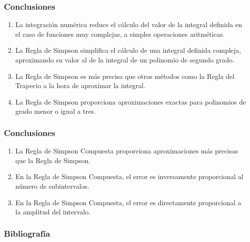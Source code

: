 \documentclass{beamer}
\begin{document}
\begin{frame}
  
  \frametitle{Conclusiones}
  
  \begin{block}{}
    \begin{enumerate}[<+->]
      \item La integraci\'on num\'erica reduce el c\'alculo del valor de la integral 
      definida en el caso de funciones muy complejas, a simples operaciones aritm\'eticas.
      \item La Regla de Simpson simplifica el c\'alculo de una integral definida 
      compleja, aproximando su valor al de la integral de un polinomio de segundo 
      grado.
      \item La Regla de Simpson es m\'as precisa que otros m\'etodos como la Regla del 
      Trapecio a la hora de aproximar la integral.
      \item La Regla de Simpson proporciona aproximaciones exactas para polinomios 
      de grado menor o igual a tres.
    \end{enumerate}
 \end{block}

\end{frame}
\begin{frame}
  
  \frametitle{Conclusiones}
  
  \begin{block}{}
    \begin{enumerate}[<+->]
      \item La Regla de Simpson Compuesta proporciona aproximaciones m\'as precisas 
      que la Regla de Simpson.
      \item En la Regla de Simpson Compuesta, el error es inversamente proporcional 
      al n\'umero de subintervalos.
      \item En la Regla de Simpson Compuesta, el error es directamente proporcional 
      a la amplitud del intervalo.
    \end{enumerate}
 \end{block}

\end{frame}
\begin{frame}

  \frametitle{Bibliografía}
  
  
  
  \nocite{*}
  
\end{frame}
\end{document}
